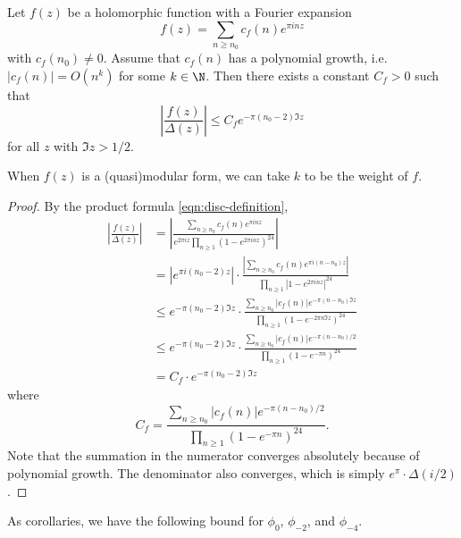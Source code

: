 \begin{lemma}\label{lemma:mod-div-disc-bound}\leanok
Let $f(z)$ be a holomorphic function with a Fourier expansion
\begin{equation}
    f(z) = \sum_{n \ge n_0} c_f(n) e^{\pi i n z}
\end{equation}
with $c_f(n_0) \ne 0$.
Assume that $c_f(n)$ has a polynomial growth, i.e. $|c_f(n)| = O(n^k)$ for some $k \in \N$.
Then there exists a constant $C_f > 0$ such that
\begin{equation}
    \left|\frac{f(z)}{\Delta(z)}\right| \le C_f e^{-\pi (n_0 - 2) \Im z}
\end{equation}
for all $z$ with $\Im z > 1/2$.
\end{lemma}
When $f(z)$ is a (quasi)modular form, we can take $k$ to be the weight of $f$.


\begin{proof}\leanok
By the product formula \eqref{eqn:disc-definition},
\begin{align}
    \left|\frac{f(z)}{\Delta(z)}\right| &= \left|\frac{\sum_{n \ge n_0} c_f(n) e^{\pi i n z}}{e^{2 \pi i z}\prod_{n \ge 1} (1 - e^{2\pi i n z})^{24}}\right| \\
    &= |e^{\pi i (n_0 - 2)z}| \cdot \frac{|\sum_{n \ge n_0} c_f(n) e^{\pi i (n - n_0) z}|}{\prod_{n \ge 1} |1 - e^{2\pi i n z}|^{24}} \\
    &\le e^{-\pi (n_0 - 2) \Im z} \cdot \frac{\sum_{n \ge n_0} |c_f(n)| e^{-\pi (n - n_0) \Im z}}{\prod_{n \ge 1} (1 - e^{- 2\pi n \Im z})^{24}} \\
    &\le e^{-\pi (n_0 - 2) \Im z} \cdot \frac{\sum_{n \ge n_0} |c_f(n)| e^{-\pi (n - n_0) / 2}}{\prod_{n \ge 1} (1 - e^{-\pi n})^{24}} \\
    &= C_f \cdot e^{-\pi (n_0 - 2) \Im z}
\end{align}
where
\begin{equation}
    C_f = \frac{\sum_{n \ge n_0} |c_f(n)| e^{-\pi (n - n_0) / 2}}{\prod_{n \ge 1} (1 - e^{-\pi n})^{24}}.
\end{equation}
Note that the summation in the numerator converges absolutely because of polynomial growth.
The denominator also converges, which is simply $e^{\pi} \cdot \Delta(i/2)$.
\end{proof}

As corollaries, we have the following bound for $\phi_0$, $\phi_{-2}$, and $\phi_{-4}$.

